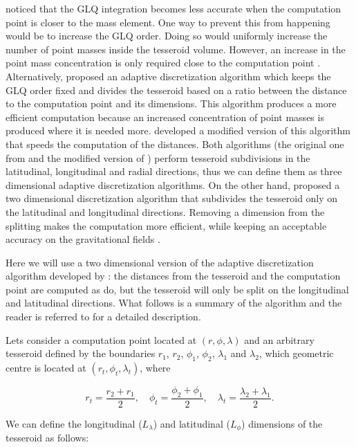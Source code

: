 \documentclass[extra, referee]{gji}
\begin{document}
\citet{Ku1977} noticed that the GLQ integration
becomes less accurate when the computation point is closer to the
mass element.
One way to prevent this from happening would be to increase the GLQ order.
Doing so would uniformly increase the number of point masses inside the
tesseroid volume.
However, an increase in the point mass concentration is only required close to the
computation point \citep{Uieda2016}.
Alternatively, \citet{Li2011} proposed an adaptive
discretization algorithm which keeps the GLQ order fixed and divides the
tesseroid based on a ratio between the distance to the computation
point and its dimensions.
This algorithm produces a more efficient computation because an increased concentration
of point masses is produced where it is needed more.
\citet{Uieda2016} developed a modified version of this algorithm that speeds the
computation of the distances.
Both algorithms (the original one from \citet{Li2011} and the modified
version of \citet{Uieda2016}) perform tesseroid subdivisions in the latitudinal,
longitudinal and radial directions, thus we can define them as three dimensional
adaptive discretization algorithms.
On the other hand, \citet{Lin2018} proposed a two dimensional discretization algorithm
that subdivides the tesseroid only on the latitudinal and longitudinal directions.
Removing a dimension from the splitting makes the computation more efficient, while
keeping an acceptable accuracy on the gravitational fields \citep{Lin2018}.

Here we will use a two dimensional version of the adaptive discretization algorithm
developed by \citet{Uieda2016}: the distances from the tesseroid and the computation
point are computed as \citet{Uieda2016} do, but the tesseroid will only be split on the
longitudinal and latitudinal directions.
What follows is a summary of the algorithm and the reader is referred to
\citet{Uieda2016} for a detailed description.

Lets consider a computation point located at $(r, \phi, \lambda)$ and an arbitrary
tesseroid defined by the boundaries $r_1$, $r_2$, $\phi_1$, $\phi_2$, $\lambda_1$ and
$\lambda_2$, which geometric centre is located at $(r_t, \phi_t, \lambda_t)$, where

\begin{equation}
    r_t = \frac{r_2 + r_1}{2}, \quad
    \phi_t = \frac{\phi_2 + \phi_1}{2}, \quad
    \lambda_t = \frac{\lambda_2 + \lambda_1}{2}.
\end{equation}

We can define the longitudinal ($L_\lambda$) and latitudinal ($L_\phi$) dimensions of
the tesseroid as follows:
\end{document}
